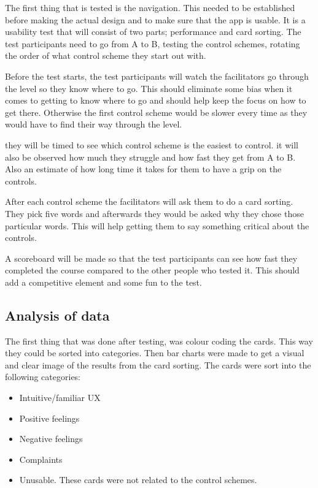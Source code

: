 The first thing that is tested is the navigation. This needed to be established before making the actual design and to make sure that the app is usable.
It is a usability test that will consist of two parts; performance and card sorting. 
The test participants need to go from A to B, testing the control schemes, rotating the order of what control scheme they start out with.

Before the test starts, the test participants will watch the facilitators go through the level so they know where to go. This should eliminate some bias when it comes to getting to know where to go and should help keep the focus on how to get there. Otherwise the first control scheme would be slower every time as they would have to find their way through the level.

they will be timed to see which control scheme is the easiest to control. it will also be observed how much they struggle and how fast they get from A to B. Also an estimate of how long time it takes for them to have a grip on the controls.

After each control scheme the facilitators will ask them to do a card sorting. They pick five words and afterwards they would be asked why they chose those particular words. This will help getting them to say something critical about the controls. 

A scoreboard will be made so that the test participants can see how fast they completed the course compared to the other people who tested it.
This should add a competitive element and some fun to the test.

\subsection{Analysis of data}

The first thing that was done after testing, was colour coding the cards. This way they could be sorted into categories. 
Then bar charts were made to get a visual and clear image of the results from the card sorting.
The cards were sort into the following categories:

\begin{itemize}
\item Intuitive/familiar UX
\item Positive feelings
\item Negative feelings
\item Complaints
\item Unusable. These cards were not related to the control schemes.
\end{itemize}

